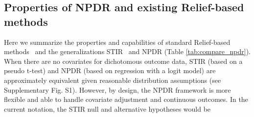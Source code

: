 \documentclass{bioinfo}
\begin{document}
% 

\subsection{Properties of NPDR and existing Relief-based methods}
Here we summarize the properties and capabilities of standard Relief-based methods~\citep{urbanowicz17b} and the generalizations STIR~\citep{stir} and NPDR (Table \ref{tab:compare_npdr}).
When there are no covariates for dichotomous outcome data, STIR (based on a pseudo t-test) and NPDR (based on regression with a logit model) are approximately equivalent given reasonable distribution assumptions (see Supplementary Fig. S1).
However, by design, the NPDR framework is more flexible and able to handle covariate adjustment and continuous outcomes.
In the current notation, the STIR null and alternative hypotheses would be
\end{document}
